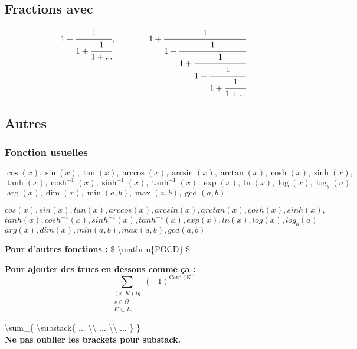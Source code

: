 \documentclass{report}
\begin{document}
\subsection*{Fractions avec  }

\begin{center}
$$ 1 + \cfrac{1}{1+\cfrac{1}{1+...}},  
\qquad\qquad
1 + \cfrac{1}{1+\cfrac{1}{1+\cfrac{1}{1+\cfrac{1}{1+\cfrac{1}{1+...}}}}} $$
\end{center}

\subsection*{Autres}

\subsubsection*{Fonction usuelles}

\begin{center}

$ \cos(x), \sin(x), \tan(x), \arccos(x), \arcsin(x), \arctan(x), \cosh(x), \sinh(x), $ \\ 
$ \tanh(x), \cosh^{-1}(x), \sinh^{-1}(x), \tanh^{-1}(x),  \exp(x), \ln(x), \log(x), \log_{b}(a) $ \\
$ \arg(x), \dim(x), \min(a,b), \max(a,b), \gcd(a,b) $ \\

\bigskip

$ cos(x), sin(x), tan(x), arccos(x), arcsin(x), arctan(x), cosh(x), sinh(x), $ \\
$ tanh(x), cosh^{-1}(x), sinh^{-1}(x), tanh^{-1}(x),  exp(x), ln(x), log(x), log_{b}(a) $ \\
$ arg(x), dim(x), min(a,b), max(a,b), gcd(a,b) $ \\

\end{center}

\textbf{Pour d'autres fonctions : }
{\selectfont \$ \textbackslash{}mathrm\{PGCD\} \$}

\textbf{Pour ajouter des trucs en dessous comme ça :}
$$ \sum_{\substack{(x,K) \, tq \\ x \in \Omega \\ K \subset I_{x}}} (-1)^{\mathrm{Card(K)}} $$ 
\begin{center}  {\selectfont \textbackslash{}sum\_\{ \textbackslash{}substack\{ ... \textbackslash{}\textbackslash{}
... \textbackslash{}\textbackslash{} ... \} \}} \\
\textbf{Ne pas oublier les brackets pour substack.}\end{center}
\end{document}
